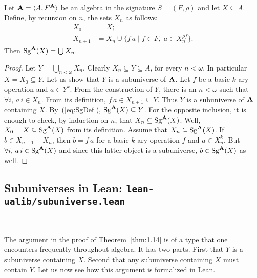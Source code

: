 \documentclass[12pt]{amsart}  %
\begin{document}
\begin{theorem} 
\label{thm:1.14} Let $\mathbf{A}  = \langle A,F^{\mathbf{A}}\rangle$  be  an  algebra in the signature 
$S = (F, \rho)$ and let $X \subseteq A$.  
Define, by recursion on $n$, the sets $X_n$ as follows:
\begin{align*}
 X_0  &=  X; \\
 X_{n+1} &=  X_n  \cup \{ f \,a  \mid f \in F, \; a \in X_n^{\rho f}\}.
\end{align*} 
Then  $\operatorname{Sg}^{\mathbf{A}}(X) =  \bigcup X_n$.
\end{theorem}
\begin{proof}
Let  $Y  =  \bigcup_{n<\omega} X_n$.  Clearly  $X_n \subseteq Y \subseteq A$, for  every 
$n< \omega$.  In  particular $X = X_0\subseteq Y$.  
Let us show that $Y$  is  a  subuniverse  of  $\mathbf{A}$.  
Let  $f$ be  a  basic  $k$-ary operation  and  $a \in Y^k$.  
From  the  construction  of  $Y$,  there  is  an  $n < \omega$
such  that $\forall i,\, a\,i \in X_n$.  From  its  definition,  
$f\, a \in X_{n+1} \subseteq Y$. 
Thus  $Y$ is  a  subuniverse  of  $\mathbf{A}$  containing  $X$.  
By~(\ref{eq:SgDef}), $\operatorname{Sg}^{\mathbf{A}}(X) \subseteq Y$.
For  the  opposite  inclusion,  it  is  enough  to  check,  by  induction  on $n$,  that 
$X_n \subseteq  \operatorname{Sg}^{\mathbf{A}}(X)$.  Well, $X_0  =  X  \subseteq  \operatorname{Sg}^{\mathbf{A}}(X)$  from  its  definition.  Assume  that $X_n \subseteq  \operatorname{Sg}^{\mathbf{A}}(X)$.  
If  $b \in X_{n+1}- X_n$,  then  $b  =  f \, a$ for a basic  $k$-ary 
operation $f$ and  $a \in X_n^k$.  But  $\forall i, \, a\, i  \in  \operatorname{Sg}^{\mathbf{A}}(X)$  and  since  this latter  object  is  a  subuniverse,  $b\in  \operatorname{Sg}^{\mathbf{A}}(X)$  as  well.
\end{proof}

\subsection{Subuniverses in Lean: \lstinline{lean-ualib/subuniverse.lean}}\

\noindent The  argument in the proof of Theorem~\ref{thm:1.14} is  of  a  type  that  one  
encounters  frequently  throughout  algebra.  It  has  two  parts.  First  that  $Y$  is  a 
subuniverse  containing  $X$.  Second  that  any  subuniverse  containing  $X$  must 
contain  $Y$.  Let us now see how this argument is formalized in Lean. 
\end{document}
